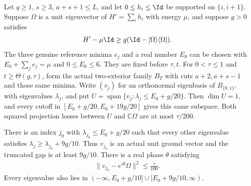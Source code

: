 \begin{lemma}
    \label{thm:aklv_two_block_scaled_low_cluster}
    \leanok
    Let $q\ge1$, $s\ge3$, $a+s+1\le L$, and let $0\le h_i\le\Id$
    be supported on $\{i,i+1\}$. Suppose $\Omega$ is a unit eigenvector of
    $H'=\sum_i h_i$ with energy $\mu$, and suppose $g>0$ satisfies
    \begin{align}
        H'-\mu\Id\ge g(\Id-|\Omega\rangle\langle\Omega|).
        \label{eq:aklv_original_rank_one_gap}
    \end{align}
    The three genuine reference minima $e_j$ and a real number $E_0$ can be
    chosen with $E_0+\sum_j e_j=\mu$ and $0\le E_0\le6$.
    They are fixed before $\tau,t$. For $0<\tau\le1$ and
    $t\ge\Theta(g,\tau)$, form the actual two-exterior family $B_T$
    with cuts $a+2,a+s-1$ and those same minima.
    Write $(v_j)$ for an orthonormal eigenbasis of $B_{\{0,1\}}$,
    with eigenvalues $\lambda_j$, and put
    $U=\operatorname{span}\{v_j:\lambda_j\le E_0+g/20\}$.
    Then $\dim U=1$, and every cutoff in
    $[E_0+g/20,E_0+19g/20]$ gives this same subspace.
    Both squared projection losses between $U$ and $\mathbb C\Omega$ are
    at most $\tau/200$.

    There is an index $j_0$ with $\lambda_{j_0}\le E_0+g/20$ such that
    every other eigenvalue satisfies
    $\lambda_j\ge\lambda_{j_0}+9g/10$.
    Thus $v_{j_0}$ is an actual unit ground vector and the truncated gap is
    at least $9g/10$. There is a real phase $\theta$ satisfying
    \begin{align}
        \|v_{j_0}-e^{i\theta}\Omega\|^2\le\frac{\tau}{100}.
        \label{eq:aklv_truncated_vector_error}
    \end{align}
    Every eigenvalue also lies in
    $(-\infty,E_0+g/10]\cup[E_0+9g/10,\infty)$.
\end{lemma}
